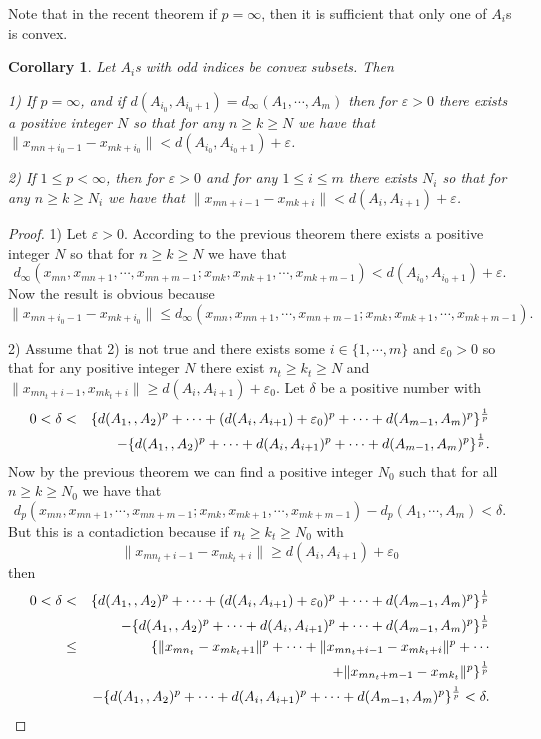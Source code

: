 \documentclass{amsart}
\newtheorem{corollary}[theorem]{Corollary}
\theoremstyle{definition}
\theoremstyle{remark}
\begin{document}
Note that in the recent theorem if $p=\infty$, then it is sufficient that only one of $A_i$s is convex.
\begin{corollary}\label{V1}Let $A_i$s with odd indices be convex subsets. Then

1)  If $p=\infty$, and if $d(A_{i_0},A_{i_0+1})=d_\infty(A_1,\cdots,A_m)$ then for $\varepsilon>0$ there exists a positive integer $N$ so that for any $n\geq k\geq N$ we have that $\|x_{mn+i_0-1}-x_{mk+i_0}\|<d(A_{i_0},A_{i_0+1})+\varepsilon$.

2) If $1\leq p<\infty$, then for $\varepsilon>0$ and for any $1\leq i\leq m$  there exists $N_i$ so that for any $n\geq k\geq N_i$ we have that $\|x_{mn+i-1}-x_{mk+i}\|<d(A_i,A_{i+1})+\varepsilon$.
\end{corollary}
\begin{proof}
1) Let $\varepsilon>0$. According to the previous theorem there exists a positive integer $N$ so that for $n\geq k\geq N$ we have that $$d_\infty(x_{mn},x_{mn+1},\cdots,x_{mn+m-1};x_{mk},x_{mk+1},\cdots,x_{mk+m-1})<d(A_{i_0},A_{i_0+1})+\varepsilon.$$ Now the result is obvious because
$$\|x_{mn+i_0-1}-x_{mk+i_0}\|\leq d_\infty(x_{mn},x_{mn+1},\cdots,x_{mn+m-1};x_{mk},x_{mk+1},\cdots,x_{mk+m-1}).$$

2) Assume that 2) is not true and there exists some $i\in\{1,\cdots,m\}$ and $\varepsilon_0>0$ so that for any positive integer $N$ there exist $n_t\geq k_t\geq N$ and $\|x_{mn_t+i-1},x_{mk_t+i}\|\geq d(A_i,A_{i+1})+\varepsilon_0$. Let $\delta$ be a positive number with
\begin{eqnarray*}
0<\delta&<&\{d(A_1,,A_2)^p+\cdots+(d(A_{i},A_{i+1})+\varepsilon_0)^p+\cdots+d(A_{m-1},A_m)^p\}^{1\over p}\\&&-\{d(A_1,,A_2)^p+\cdots+d(A_{i},A_{i+1})^p+\cdots+d(A_{m-1},A_m)^p\}^{1\over p}.
\end{eqnarray*}
Now by the previous theorem we can find a positive integer $N_0$ such that for all $n\geq k\geq N_0$ we have that
$$d_p(x_{mn},x_{mn+1},\cdots,x_{mn+m-1};x_{mk},x_{mk+1},\cdots,x_{mk+m-1})-d_p(A_1,\cdots,A_m)<\delta.$$
But this is a contadiction because if $n_t\geq k_t\geq N_0$ with $$\|x_{mn_t+i-1}-x_{mk_t+i}\|\geq d(A_i,A_{i+1})+\varepsilon_0$$ then
\begin{eqnarray*}
0<\delta&<&\{d(A_1,,A_2)^p+\cdots+(d(A_{i},A_{i+1})+\varepsilon_0)^p+\cdots+d(A_{m-1},A_m)^p\}^{1\over p}\\&&-\{d(A_1,,A_2)^p+\cdots+d(A_{i},A_{i+1})^p+\cdots+d(A_{m-1},A_m)^p\}^{1\over p}\\
&\leq&\{\|x_{mn_t}-x_{mk_t+1}\|^p+\cdots+\|x_{mn_t+i-1}-x_{mk_t+i}\|^p+\cdots\\&&+\|x_{mn_t+m-1}-x_{mk_t}\|^p\}^{1\over p}\\&&-\{d(A_1,,A_2)^p+\cdots+d(A_{i},A_{i+1})^p+\cdots+d(A_{m-1},A_m)^p\}^{1\over p}<\delta.
\end{eqnarray*}
\end{proof}
\end{document}
